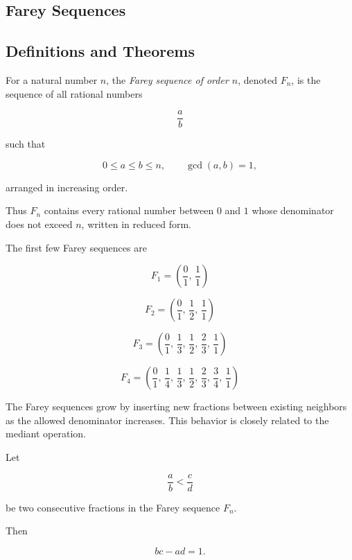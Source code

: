 
\subsection{Farey Sequences}

\subsection{Definitions and Theorems}

\begin{definition}
For a natural number $n$, the \emph{Farey sequence of order $n$}, 
denoted $F_n$, is the sequence of all rational numbers

\[
\frac{a}{b}
\]

such that

\[
0 \le a \le b \le n, \qquad \gcd(a,b)=1,
\]

arranged in increasing order.
\end{definition}

\begin{remark}
Thus $F_n$ contains every rational number between $0$ and $1$
whose denominator does not exceed $n$, written in reduced form.
\end{remark}

\begin{example}
The first few Farey sequences are

\[
F_1 =
\left(
\frac{0}{1},\,
\frac{1}{1}
\right)
\]

\[
F_2 =
\left(
\frac{0}{1},\,
\frac{1}{2},\,
\frac{1}{1}
\right)
\]

\[
F_3 =
\left(
\frac{0}{1},\,
\frac{1}{3},\,
\frac{1}{2},\,
\frac{2}{3},\,
\frac{1}{1}
\right)
\]

\[
F_4 =
\left(
\frac{0}{1},\,
\frac{1}{4},\,
\frac{1}{3},\,
\frac{1}{2},\,
\frac{2}{3},\,
\frac{3}{4},\,
\frac{1}{1}
\right)
\]
\end{example}

\begin{remark}
The Farey sequences grow by inserting new fractions between existing
neighbors as the allowed denominator increases.
This behavior is closely related to the mediant operation.
\end{remark}

\begin{theorem}
Let

\[
\frac{a}{b} < \frac{c}{d}
\]

be two consecutive fractions in the Farey sequence $F_n$.

Then

\[
bc - ad = 1.
\]
\end{theorem}


